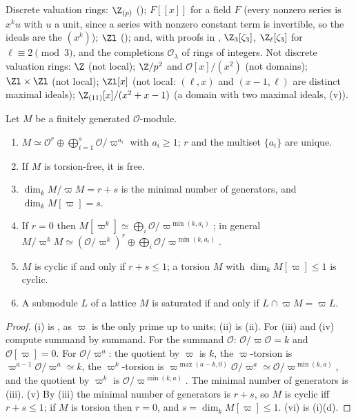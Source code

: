 \begin{example}\label{ex:modules:dvr-examples}
Discrete valuation rings: $\Z_{(p)}$ (); $F[[x]]$ for a field $F$ (every nonzero series is $x^ku$ with $u$ a unit, since a
series with nonzero constant term is invertible, so the ideals are the $(x^k)$); $\Zl$ (); and, with proofs in
, $\Z_3[\zeta_3]$, $\Z_\ell[\zeta_3]$ for $\ell\equiv2\pmod3$, and the completions $\mathcal O_\lambda$ of rings of integers.
Not discrete valuation rings: $\Z$ (not local); $\Z/p^2$ and $\mathcal O[x]/(x^2)$ (not domains); $\Zl\times\Zl$ (not local); $\Zl[x]$ (not local:
$(\ell,x)$ and $(x-1,\ell)$ are distinct maximal ideals); $\Z_{(11)}[x]/(x^2+x-1)$ (a domain with two maximal ideals,
(v)).
\end{example}

\begin{proposition}\label{prop:modules:dvr-modules}
Let $M$ be a finitely generated $\mathcal O$-module.
\begin{enumerate}[label=(\roman*)]
\item $M\simeq\mathcal O^r\oplus\bigoplus_{i=1}^s\mathcal O/\varpi^{a_i}$ with $a_i\ge1$; $r$ and the multiset $\{a_i\}$ are unique.
\item If $M$ is torsion-free, it is free.
\item $\dim_kM/\varpi M=r+s$ is the minimal number of generators, and $\dim_kM[\varpi]=s$.
\item If $r=0$ then $M[\varpi^k]\simeq\bigoplus_i\mathcal O/\varpi^{\min(k,a_i)}$; in general $M/\varpi^kM\simeq(\mathcal O/\varpi^k)^r\oplus\bigoplus_i\mathcal O/\varpi^{\min(k,a_i)}$.
\item $M$ is cyclic if and only if $r+s\le1$; a torsion $M$ with $\dim_kM[\varpi]\le1$ is cyclic.
\item A submodule $L$ of a lattice $M$ is saturated if and only if $L\cap\varpi M=\varpi L$.
\end{enumerate}
\end{proposition}

\begin{proof}
(i) is , as $\varpi$ is the only prime up to units; (ii) is (ii). For (iii) and (iv)
compute summand by summand. For the summand $\mathcal O$: $\mathcal O/\varpi\mathcal O=k$ and $\mathcal O[\varpi]=0$. For $\mathcal O/\varpi^a$: the quotient by $\varpi$ is $k$, the
$\varpi$-torsion is $\varpi^{a-1}\mathcal O/\varpi^a\simeq k$, the $\varpi^k$-torsion is $\varpi^{\max(a-k,0)}\mathcal O/\varpi^a\simeq\mathcal O/\varpi^{\min(k,a)}$, and the quotient by $\varpi^k$
is $\mathcal O/\varpi^{\min(k,a)}$. The minimal
number of generators is (iii). (v) By (iii) the minimal number of generators is $r+s$, so $M$ is cyclic iff
$r+s\le1$; if $M$ is torsion then $r=0$, and $s=\dim_kM[\varpi]\le1$. (vi) is (i)(d).
\end{proof}

